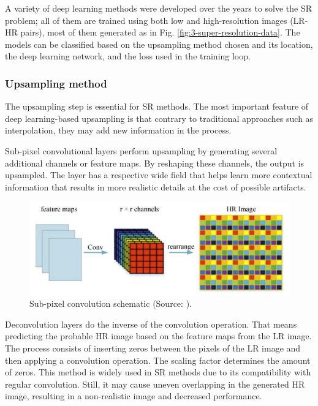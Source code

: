         A variety of deep learning methods were developed over the years to solve the SR problem; all of them are trained using both low and high-resolution images (LR-HR pairs), most of them generated as in Fig. \ref{fig:3-super-resolution-data}. The models can be classified based on the upsampling method chosen and its location, the deep learning network, and the loss used in the training loop.


        \subsubsection{Upsampling method}

        The upsampling step is essential for SR methods. The most important feature of deep learning-based upsampling is that contrary to traditional approaches such as interpolation, they may add new information in the process.

        Sub-pixel convolutional layers perform upsampling by generating several additional channels or feature maps. By reshaping these channels, the output is upsampled. The layer has a respective wide field that helps learn more contextual information that results in more realistic details at the cost of possible artifacts.
        
        \begin{figure}[H]
            \centering
            \includegraphics[width=\textwidth]{Includes/2-sub-pixel-convolution.png}
            \caption{Sub-pixel convolution schematic (Source: \cite{Liu2019}).}
            \label{fig:2-sub-pixel-convolution}
        \end{figure}


        

        Deconvolution layers do the inverse of the convolution operation. 
        That means predicting the probable HR image based on the feature maps from the LR image. The process consists of inserting zeros between the pixels of the LR image and then applying a convolution operation. The scaling factor determines the amount of zeros. This method is widely used in SR methods due to its compatibility with regular convolution. Still, it may cause uneven overlapping in the generated HR image, resulting in a non-realistic image and decreased performance.

